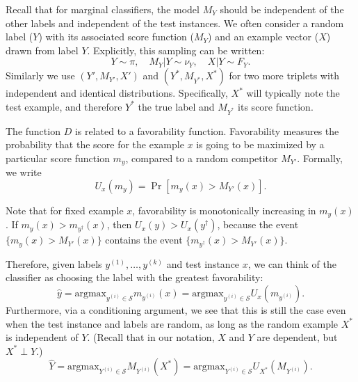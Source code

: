 \documentclass[twoside,11pt]{article}
\newcommand{\argmax}{\text{argmax}}
\begin{document}
Recall that for marginal classifiers, the model $M_Y$ should be independent of the other labels and independent of the test instances. 
We often consider a random label ($Y$) with
its associated score function ($M_Y$) and an example vector ($X$) drawn from label $Y$. Explicitly, this
sampling can be written: %
\[Y \sim \pi,\quad M_{Y}|Y \sim \nu_{Y},\quad X|Y \sim F_{Y}. \]
Similarly we use $(Y',M_{Y'},X')$ and $(Y^*,M_{Y^*},X^*)$ for two more
triplets with independent and identical distributions. Specifically,
$X^*$ will typically note the test example, and therefore $Y^*$ the
true label and $M_{Y^*}$ its score function.

The function ${D}$ is related to a favorability
function. Favorability measures the probability that the score for the
example $x$ is going to be maximized by a particular score function $m_y$,
compared to a random competitor $M_{Y'}$. %
Formally, we write
\begin{equation}\label{eq:U_function}
U_{x}(m_{y}) = \Pr[m_{y}(x) > M_{Y'}(x)].
\end{equation}

Note that for fixed example $x$, favorability is monotonically
increasing in $m_{y}(x)$.  If $m_y(x) > m_{y^\dagger}(x)$, then
$U_{x}(y) > U_{x}(y^\dagger)$, because the event $\{m_{y}(x) >
M_{Y'}(x)\}$ contains the event $\{m_{y^\dagger}(x) >
M_{Y'}(x)\}$.

Therefore, given labels $y^{(1)},\hdots,y^{(k)}$ and test instance
$x$, we can think of the classifier as choosing the label with the
greatest favorability:
\[
\hat{y} = \argmax_{y^{(i)} \in \mathcal{S}} m_{y^{(i)}}(x) = \argmax_{y^{(i)} \in \mathcal{S}} U_{x}(m_{y^{(i)}}).
\]
Furthermore, via a conditioning argument, we see that this is still
the case even when the test instance and labels are random, 
as long as the random example $X^*$ is independent of $Y$.  
(Recall that in our notation, $X$ and $Y$ are dependent, but $X^* \perp Y$.)
\[
\hat{Y} = \argmax_{Y^{(i)} \in \mathcal{S}} M_{Y^{(i)}}(X^*) = \argmax_{Y^{(i)} \in \mathcal{S}} U_{X^*}(M_{Y^{(i)}}).
\]

\end{document}
